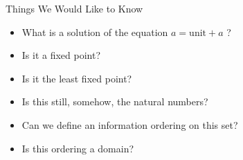 \documentclass{beamer}
\begin{document}
\begin{frame}{Things We Would Like to Know}

  \begin{itemize}
    \item What is a solution of the equation $a = \text{unit} + a$ ?
    \item Is it a fixed point?
    \item Is it the least fixed point?
    \item Is this still, somehow, the natural numbers?
    \item Can we define an information ordering on this set?
    \item Is this ordering a domain?
  \end{itemize}

\end{frame}
\end{document}
